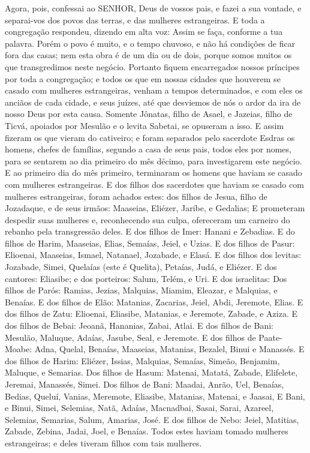 {Agora, pois, confessai ao SENHOR, Deus de vossos pais, e fazei a sua vontade, e separai-vos dos povos das terras, e das mulheres estrangeiras.
E toda a congregação respondeu, dizendo em alta voz: Assim se faça, conforme a tua palavra.
Porém o povo é muito, e o tempo chuvoso, e não há condições de ficar fora das casas; nem esta obra é de um dia ou de dois, porque somos muitos os que transgredimos neste negócio.
Portanto fiquem encarregados nossos príncipes por toda a congregação; e todos os que em nossas cidades que houverem se casado com mulheres estrangeiras, venham a tempos determinados, e com eles os anciãos de cada cidade, e seus juízes, até que desviemos de nós o ardor da ira de nosso Deus por esta causa.
Somente Jônatas, filho de Asael, e Jazeias, filho de Ticvá, apoiados por Mesulão e o levita Sabetai, se opuseram a isso.
E assim fizeram os que vieram do cativeiro; e foram separados pelo sacerdote Esdras os homens, chefes de famílias, segundo a casa de seus pais, todos eles por nomes, para se sentarem ao dia primeiro do mês décimo, para investigarem este negócio.
E ao primeiro dia do mês primeiro, terminaram
{} os homens que haviam se casado com mulheres estrangeiras.
E dos filhos dos sacerdotes que haviam se casado com mulheres estrangeiras, foram achados estes: dos filhos de Jesua, filho de Jozadaque, e de seus irmãos: Maaseias, Eliézer, Jaribe, e Gedalias;
E prometeram despedir suas mulheres e, reconhecendo sua culpa, ofereceram um carneiro do rebanho pela transgressão deles.
E dos filhos de Imer: Hanani e Zebadias.
E do filhos de Harim, Maaseias, Elias, Semaías, Jeiel, e Uzias.
E dos filhos de Pasur: Elioenai, Maaseias, Ismael, Natanael, Jozabade, e Elasá.
E dos filhos dos levitas: Jozabade, Simei, Quelaías (este é Quelita), Petaías, Judá, e Eliézer.
E dos cantores: Eliasibe; e dos porteiros: Salum, Telém, e Uri.
E dos
{} israelitas: Dos filhos de Parós: Ramias, Jezias, Malquias, Miamim, Eleazar, e Malquias, e Benaías.
E dos filhos de Elão: Matanias, Zacarias, Jeiel, Abdi, Jeremote, Elias.
E dos filhos de Zatu: Elioenai, Eliasibe, Matanias, e Jeremote, Zabade, e Aziza.
E dos filhos de Bebai: Jeoanã, Hananias, Zabai, Atlai.
E dos filhos de Bani: Mesulão, Maluque, Adaías, Jasube, Seal, e Jeremote.
E dos filhos de Paate-Moabe: Adna, Quelal, Benaías, Maaseias, Matanias, Bezalel, Binui e Manassés.
E dos filhos de Harim: Eliézer, Issias, Malquias, Semaías, Simeão,
Benjamim, Maluque, e Semarias.
Dos filhos de Hasum: Matenai, Matatá, Zabade, Elifelete, Jeremai, Manassés, Simei.
Dos filhos de Bani: Maadai, Anrão, Uel,
Benaías, Bedias, Queluí,
Vanias, Meremote, Eliasibe,
Matanias, Matenai, e Jaasai,
E Bani, e Binui, Simei,
Selemias, Natã, Adaías,
Macnadbai, Sasai, Sarai,
Azareel, Selemias, Semarias,
Salum, Amarias, José.
E dos filhos de Nebo: Jeiel, Matitias, Zabade, Zebina, Jadai, Joel, e Benaías.
Todos estes haviam tomado mulheres estrangeiras; e
{} deles tiveram filhos com tais mulheres.\par }